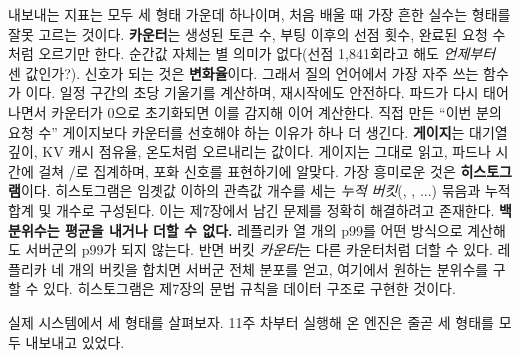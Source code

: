 내보내는 지표는 모두 세 형태 가운데 하나이며, 처음 배울 때 가장 흔한 실수는 형태를 잘못 고르는 것이다. \textbf{카운터}는 생성된 토큰 수, 부팅 이후의 선점 횟수, 완료된 요청 수처럼 오르기만 한다. 순간값 자체는 별 의미가 없다(선점 1,841회라고 해도 \textit{언제부터} 센 값인가?). 신호가 되는 것은 \textbf{변화율}이다. 그래서 질의 언어에서 가장 자주 쓰는 함수가 이다. 일정 구간의 초당 기울기를 계산하며, 재시작에도 안전하다. 파드가 다시 태어나면서 카운터가 0으로 초기화되면 이를 감지해 이어 계산한다. 직접 만든 “이번 분의 요청 수” 게이지보다 카운터를 선호해야 하는 이유가 하나 더 생긴다. \textbf{게이지}는 대기열 깊이, KV 캐시 점유율, 온도처럼 오르내리는 값이다. 게이지는 그대로 읽고, 파드나 시간에 걸쳐 /로 집계하며, 포화 신호를 표현하기에 알맞다. 가장 흥미로운 것은 \textbf{히스토그램}이다. 히스토그램은 임곗값 이하의 관측값 개수를 세는 \textit{누적 버킷}(, , ...) 묶음과 누적 합계 및 개수로 구성된다. 이는 제7장에서 남긴 문제를 정확히 해결하려고 존재한다. \textbf{백분위수는 평균을 내거나 더할 수 없다.} 레플리카 열 개의 p99를 어떤 방식으로 계산해도 서버군의 p99가 되지 않는다. 반면 버킷 \textit{카운터}는 다른 카운터처럼 더할 수 있다. 레플리카 네 개의  버킷을 합치면 서버군 전체 분포를 얻고, 여기에서 원하는 분위수를 구할 수 있다. 히스토그램은 제7장의 문법 규칙을 데이터 구조로 구현한 것이다.

실제 시스템에서 세 형태를 살펴보자. 11주 차부터 실행해 온 엔진은 줄곧 세 형태를 모두 내보내고 있었다.

